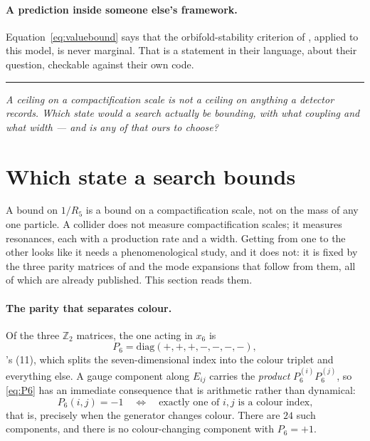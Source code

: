 \documentclass[11pt,a4paper]{article}
\newcommand{\ZZ}{\mathbb{Z}}
\newcommand{\bridge}[1]{\par\medskip\noindent
  \textcolor{hdrblue!45}{\rule{2.2cm}{0.6pt}}\;\;\parbox[t]{0.84\textwidth}{\small\itshape
  \textcolor{hdrblue!85}{#1}}\par\medskip}
\begin{document}
\paragraph{A prediction inside someone else's framework.} Equation~\eqref{eq:valuebound} says that
the orbifold-stability criterion of \cite{CCD24}, applied to this model, is never marginal. That is
a statement in their language, about their question, checkable against their own code.

\bridge{A ceiling on a compactification scale is not a ceiling on anything a detector records.
Which state would a search actually be bounding, with what coupling and what width --- and is any
of that ours to choose?}

\section{Which state a search bounds}\label{sec:collider}

A bound on $1/R_5$ is a bound on a compactification scale, not on the mass of any one particle. A
collider does not measure compactification scales; it measures resonances, each with a production
rate and a width. Getting from one to the other looks like it needs a phenomenological study, and
it does not: it is fixed by the three parity matrices of \cite{KM25} and the mode expansions that
follow from them, all of which are already published. This section reads them.

\paragraph{The parity that separates colour.} Of the three $\ZZ_2$ matrices, the one acting in
$x_6$ is
\begin{equation}\label{eq:P6}
  P_6=\mathrm{diag}(+,+,+,-,-,-,-),
\end{equation}
\cite{KM25}'s (11), which splits the seven-dimensional index into the colour triplet and
everything else. A gauge component along $E_{ij}$ carries the \emph{product} $P_6^{(i)}P_6^{(j)}$,
so \eqref{eq:P6} has an immediate consequence that is arithmetic rather than dynamical:
\begin{equation}\label{eq:colourparity}
  P_6(i,j)=-1
  \quad\Longleftrightarrow\quad
  \text{exactly one of } i,j \text{ is a colour index,}
\end{equation}
that is, precisely when the generator changes colour. There are $24$ such components, and there is
no colour-changing component with $P_6=+1$.
\end{document}
